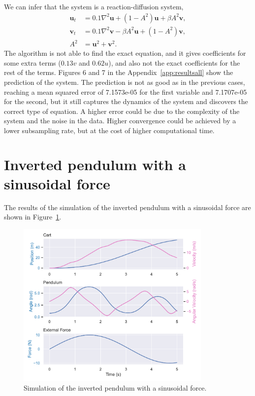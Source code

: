 \documentclass[unicode,11pt,a4paper,oneside,numbers=endperiod,openany]{scrartcl}
\begin{document}
We can infer that the system is a reaction-diffusion system,
\begin{align}
    \mathbf{u}_t &= 0.1 \nabla^2 \mathbf{u} + (1 - A^2) \mathbf{u} + \beta A^2 \mathbf{v}, \\
    \mathbf{v}_t &= 0.1 \nabla^2 \mathbf{v} - \beta A^2 \mathbf{u} + (1 - A^2) \mathbf{v}, \\
    A^2 &= \mathbf{u}^2 + \mathbf{v}^2.
\end{align}
The algorithm is not able to find the exact equation, and it gives coefficients
for some extra terms
($0.13v$ and $0.62u$), and also not the exact coefficients for the rest of the
terms.
Figures 6 and 7 in the Appendix~\ref{app:resultsall}
show the prediction of the system.
The prediction is not as good as in the previous cases, reaching a mean
squared error of 7.1573e-05 for the first variable and 7.1707e-05 for the
second, 
but it still captures the dynamics of the system and discovers
the correct type of equation. A higher error could be due to the complexity of the system and the noise
in the data. Higher convergence could be achieved by a lower subsampling rate,
but at the cost of higher computational time.





\newpage
\appendix
\section {Inverted pendulum with a sinusoidal force}\label{app:pendulum}
The results of the simulation of the inverted pendulum with a sinusoidal force are shown in Figure~\ref{fig:pendulum}.
\begin{figure}[h!]
    \centering
    \includegraphics[width=0.85\textwidth]{../Task1/figures/pendulum.pdf}
    \caption{Simulation of the inverted pendulum with a sinusoidal force.}
    \label{fig:pendulum}
\end{figure}
\end{document}
